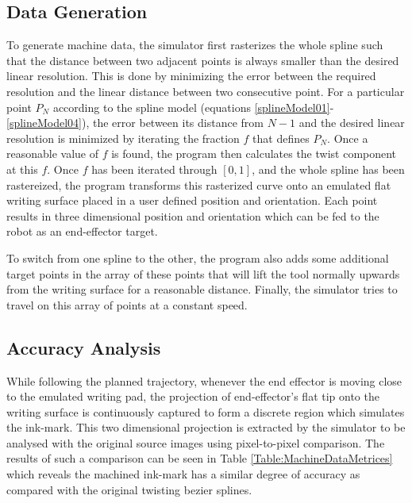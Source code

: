 \subsection{Data Generation}
    To generate machine data, the simulator first rasterizes the whole spline such that the distance between two adjacent points is always smaller than the desired linear resolution. This is done by minimizing the error between the required resolution and the linear distance between two consecutive point. For a particular point $P_N$ according to the spline model (equations \ref{splineModel01}-\ref{splineModel04}), the error between its distance from $N - 1$ and the desired linear resolution is minimized by iterating the fraction $f$ that defines $P_N$. Once a reasonable value of $f$ is found, the program then calculates the twist component at this $f$. Once $f$ has been iterated through $[0,1]$, and the whole spline has been rastereized, the program transforms this rasterized curve onto an emulated flat writing surface placed in a user defined position and orientation. Each point results in three dimensional position and orientation which can be fed to the robot as an end-effector target.

    To switch from one spline to the other, the program also adds some additional target points in the array of these points that will lift the tool normally upwards from the writing surface for a reasonable distance. Finally, the simulator tries to travel on this array of points at a constant speed.
\subsection{Accuracy Analysis}
    While following the planned trajectory, whenever the end effector is moving close to the emulated writing pad, the projection of end-effector's flat tip onto the writing surface is continuously captured to form a discrete region which simulates the ink-mark. This two dimensional projection is extracted by the simulator to be analysed with the original source images using pixel-to-pixel comparison. The results of such a comparison can be seen in Table \ref{Table:MachineDataMetrices} which reveals the machined ink-mark has a similar degree of accuracy as compared with the original twisting bezier splines.

